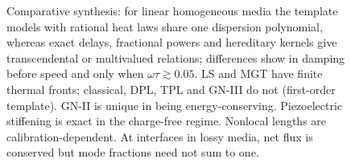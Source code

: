 \begin{figure}[t]
\begin{summarybox}[Summary]
Comparative synthesis: for linear homogeneous media the template models with rational heat laws share one dispersion polynomial, whereas exact delays, fractional powers and hereditary kernels give transcendental or multivalued relations; differences show in damping before speed and only when $\omega\tau\gtrsim0.05$. LS and MGT have finite thermal fronts; classical, DPL, TPL and GN-III do not (first-order template). GN-II is unique in being energy-conserving. Piezoelectric stiffening is exact in the charge-free regime. Nonlocal lengths are calibration-dependent. At interfaces in lossy media, net flux is conserved but mode fractions need not sum to one.
\end{summarybox}
\end{figure}
